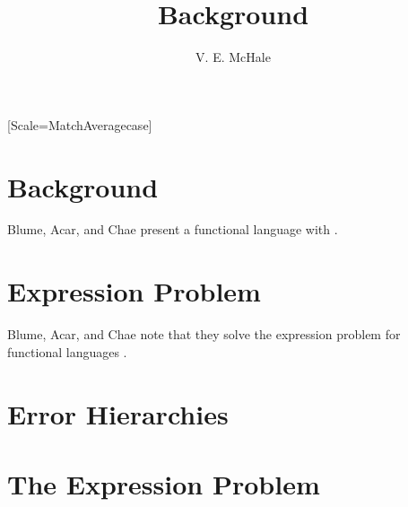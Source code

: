 \documentclass{article}
\begin{document}
\title{Background}
\author {V. E. McHale}
\maketitle

\tableofcontents

\setmonofont{DejaVu Sans Mono}[Scale=MatchAveragecase]


\section{Background}

Blume, Acar, and Chae present a functional language with \cite{blume2006}.


\section{Expression Problem}

Blume, Acar, and Chae note that they solve the expression problem for functional languages \cite{blume2006}.






\section{Error Hierarchies}





\appendix

\section{The Expression Problem}
\end{document}
